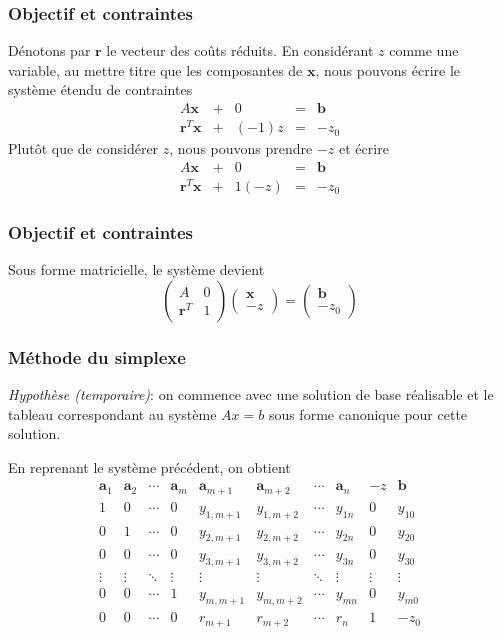 \documentclass[t,usepdftitle=false]{beamer}
\def\ba{\boldsymbol{a}}
\def\bb{\boldsymbol{b}}
\def\br{\boldsymbol{r}}
\def\bx{\boldsymbol{x}}
\begin{document}
\begin{frame}
\frametitle{Objectif et contraintes}

Dénotons par $\br$ le vecteur des coûts réduits. En considérant $z$ comme une variable, au mettre titre que les composantes de $\bx$, nous pouvons écrire le système étendu de contraintes
$$
\begin{matrix}
A\bx & + & 0 & = & \bb \\
\br^T \bx & + & (-1)z & = &  -z_0 
\end{matrix}
$$
Plutôt que de considérer $z$, nous pouvons prendre $-z$ et écrire
$$
\begin{matrix}
	A\bx & + & 0 & = & \bb \\
	\br^T \bx & + & 1(-z) & = &  -z_0
\end{matrix}
$$

\end{frame}

\begin{frame}
\frametitle{Objectif et contraintes}

Sous forme matricielle, le système devient
$$
\begin{pmatrix}
	A & 0 \\
	\br^T & 1 
\end{pmatrix}
\begin{pmatrix}
	\bx \\
	-z 
\end{pmatrix}
=
\begin{pmatrix}
	\bb \\
	 -z_0
\end{pmatrix}
$$

\end{frame}

\begin{frame}
\frametitle{Méthode du simplexe}

\textit{Hypothèse (temporaire)}: on commence avec une solution de base réalisable et le tableau correspondant au système $Ax = b$ sous forme canonique pour cette solution.

\mbox{}

En reprenant le système précédent, on obtient
$$
\begin{matrix}
\ba_1 & \ba_2 & \cdots & \ba_m & \ba_{m+1} &
\ba_{m+2} & \cdots & \ba_n & -z & \bb \\
1 & 0 & \cdots & 0 & y_{1,m+1} & y_{1,m+2} & \cdots & y_{1n} & 0 & y_{10} \\
0 & 1 & \cdots & 0 & y_{2,m+1} & y_{2,m+2} & \cdots & y_{2n} & 0 & y_{20} \\
0 & 0 & \cdots & 0 & y_{3,m+1} & y_{3,m+2} & \cdots & y_{3n} & 0 & y_{30} \\
\vdots & \vdots & \ddots & \vdots & \vdots & \vdots & \ddots & \vdots & \vdots & \vdots \\
0 & 0 & \cdots & 1 & y_{m,m+1} & y_{m,m+2} & \cdots & y_{mn} & 0 & y_{m0} \\
0 & 0 & \cdots & 0 & r_{m+1} & r_{m+2} & \cdots & r_n & 1 & -z_0
\end{matrix}
$$

\end{frame}
\end{document}
